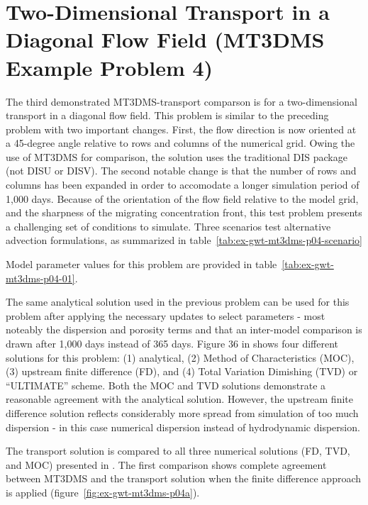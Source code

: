 \section{Two-Dimensional Transport in a Diagonal Flow Field (MT3DMS Example Problem 4)}

The third demonstrated MT3DMS-\mf transport comparson is for a two-dimensional transport in a diagonal flow field. This problem is similar to the preceding problem with two important changes. First, the flow direction is now oriented at a 45-degree angle relative to rows and columns of the numerical grid. Owing the use of MT3DMS for comparison, the \mf solution uses the traditional DIS package (not DISU or DISV).  The second notable change is that the number of rows and columns has been expanded in order to accomodate a longer simulation period of 1,000 days. Because of the orientation of the flow field relative to the model grid, and the sharpness of the migrating concentration front, this test problem presents a challenging set of conditions to simulate. Three scenarios test alternative advection formulations, as summarized in table~\ref{tab:ex-gwt-mt3dms-p04-scenario}



Model parameter values for this problem are provided in table~\ref{tab:ex-gwt-mt3dms-p04-01}.



The same analytical solution used in the previous problem can be used for this problem after applying the necessary updates to select parameters - most noteably the dispersion and porosity terms and that an inter-model comparison is drawn after 1,000 days instead of 365 days. Figure 36 in \cite{zheng1999mt3dms} shows four different solutions for this problem: (1) analytical, (2) Method of Characteristics (MOC), (3) upstream finite difference (FD), and (4) Total Variation Dimishing (TVD) or ``ULTIMATE'' scheme.  Both the MOC and TVD solutions demonstrate a reasonable agreement with the analytical solution. However, the upstream finite difference solution reflects considerably more spread from simulation of too much dispersion - in this case numerical dispersion instead of hydrodynamic dispersion. 

The \mf transport solution is compared to all three numerical solutions (FD, TVD, and MOC) presented in \cite{zheng1999mt3dms}. The first comparison shows complete agreement between MT3DMS and the \mf transport solution when the finite difference approach is applied (figure~\ref{fig:ex-gwt-mt3dms-p04a}). 

